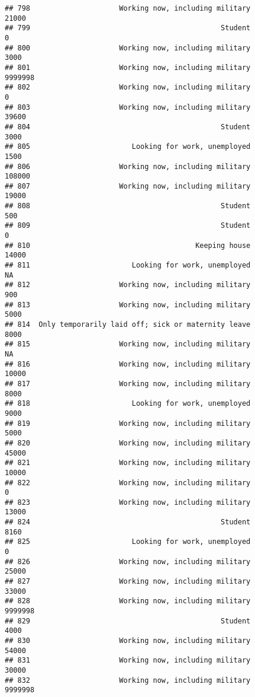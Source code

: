 \documentclass[]{book}
\theoremstyle{definition}
\theoremstyle{definition}
\theoremstyle{remark}
\begin{document}
\begin{verbatim}
## 798                     Working now, including military           21000
## 799                                             Student               0
## 800                     Working now, including military            3000
## 801                     Working now, including military         9999998
## 802                     Working now, including military               0
## 803                     Working now, including military           39600
## 804                                             Student            3000
## 805                        Looking for work, unemployed            1500
## 806                     Working now, including military          108000
## 807                     Working now, including military           19000
## 808                                             Student             500
## 809                                             Student               0
## 810                                       Keeping house           14000
## 811                        Looking for work, unemployed              NA
## 812                     Working now, including military             900
## 813                     Working now, including military            5000
## 814  Only temporarily laid off; sick or maternity leave            8000
## 815                     Working now, including military              NA
## 816                     Working now, including military           10000
## 817                     Working now, including military            8000
## 818                        Looking for work, unemployed            9000
## 819                     Working now, including military            5000
## 820                     Working now, including military           45000
## 821                     Working now, including military           10000
## 822                     Working now, including military               0
## 823                     Working now, including military           13000
## 824                                             Student            8160
## 825                        Looking for work, unemployed               0
## 826                     Working now, including military           25000
## 827                     Working now, including military           33000
## 828                     Working now, including military         9999998
## 829                                             Student            4000
## 830                     Working now, including military           54000
## 831                     Working now, including military           30000
## 832                     Working now, including military         9999998

\end{verbatim}
\end{document}
